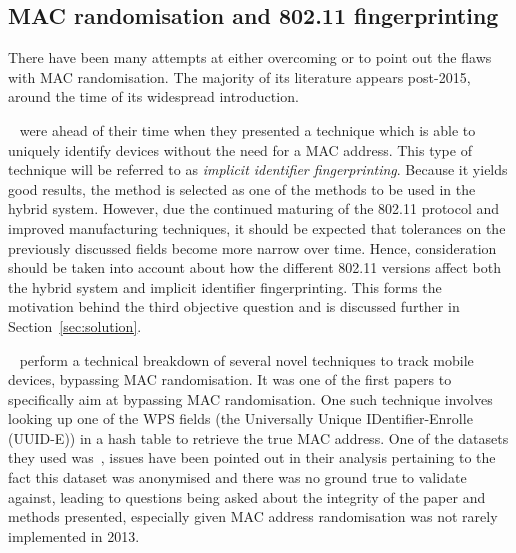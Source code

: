 
\subsection{MAC randomisation and 802.11 fingerprinting}\label{sec:mac-randomisation-lit}

There have been many attempts at either overcoming or to point out the flaws with MAC randomisation.
The majority of its literature appears post-2015, around the time of its widespread introduction.

~ were ahead of their time when they presented a technique which is able to uniquely identify devices without the need for a MAC address.
This type of technique will be referred to as \emph{implicit identifier fingerprinting}.
Because it yields good results, the method is selected as one of the methods to be used in the hybrid system.
However, due the continued maturing of the 802.11 protocol and improved manufacturing techniques, it should be expected that tolerances on the previously discussed fields become more narrow over time.
Hence, consideration should be taken into account about how the different 802.11 versions affect both the hybrid system and implicit identifier fingerprinting.
This forms the motivation behind the third objective question and is discussed further in Section~\ref{sec:solution}.

~ perform a technical breakdown of several novel techniques to track mobile devices, bypassing MAC randomisation.
It was one of the first papers to specifically aim at bypassing MAC randomisation.
One such technique involves looking up one of the WPS fields (the Universally Unique IDentifier-Enrolle (UUID-E)) in a hash table to retrieve the true MAC address.
One of the datasets they used was~\cite{barbera2013crawdad}, issues have been pointed out in their analysis pertaining to the fact this dataset was anonymised and there was no ground true to validate against, leading to questions being asked about the integrity of the paper and methods presented, especially given MAC address randomisation was not rarely implemented in 2013.


